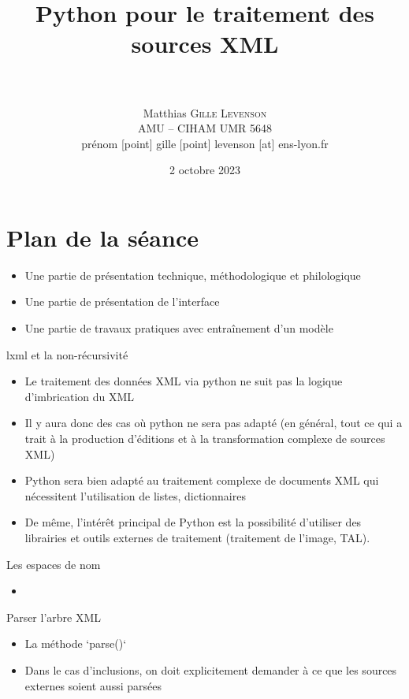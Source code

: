 \documentclass[11pt,aspectratio=169]{beamer}
\date[2 octobre 2023]{2 octobre 2023}
\author[Matthias \textsc{Gille Levenson}]{\\~\\ Matthias \textsc{Gille Levenson}\\   {\scriptsize AMU -- CIHAM UMR 5648}\\ {\tiny prénom [point] gille [point] levenson [at] ens-lyon.fr}\vspace{-1cm}}
\title[Transcription automatisée et HTR]{Python pour le traitement des sources XML}
\begin{document}
\maketitle



\section{Plan de la séance}


\begin{frame}
\begin{itemize}
\item Une partie de présentation technique, méthodologique et philologique
\item Une partie de présentation de l'interface
\item Une partie de travaux pratiques avec entraînement d'un modèle
\end{itemize}
\end{frame}


\begin{frame}{lxml et la non-récursivité}
\begin{itemize}
\item Le traitement des données XML via python ne suit pas la logique d'imbrication du XML
\item Il y aura donc des cas où python ne sera pas adapté (en général, tout ce qui a trait à la production d'éditions et à la transformation complexe de sources XML)
\item Python sera bien adapté au traitement complexe de documents XML qui nécessitent l'utilisation de listes, dictionnaires
\item De même, l'intérêt principal de Python est la possibilité d'utiliser des librairies et outils externes de traitement (traitement de l'image, TAL).
\end{itemize}
\end{frame}

\begin{frame}{Les espaces de nom}
\begin{itemize}
\item 
\end{itemize}
\end{frame}


\begin{frame}{Parser l'arbre XML}
\begin{itemize}
\item La méthode `parse()`
\item Dans le cas d'inclusions, on doit explicitement demander à ce que les sources externes soient aussi parsées
\end{itemize}
\end{frame}
\end{document}
